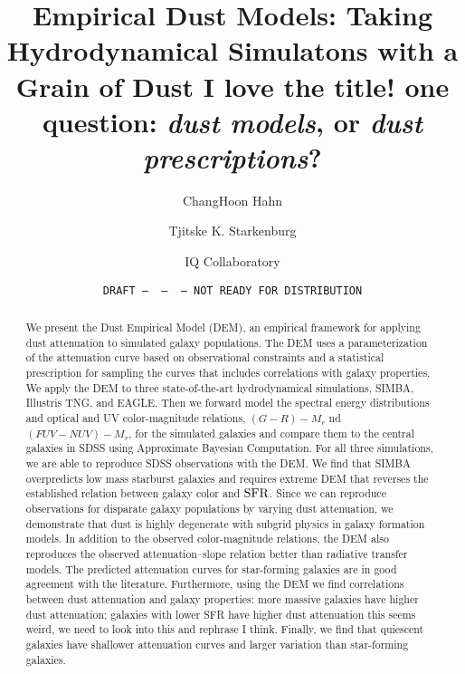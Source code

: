 \documentclass[12pt, letterpaper, preprint]{aastex62}
\newcommand{\gr}{G{-}R}
\newcommand{\fnuv}{FUV{-}NUV}
\newcommand{\sfr}{{\rm SFR}}
\newcommand{\tks}[1]{{\color{blue}{\bf TKS:} #1}}
\begin{document}
\sloppy\sloppypar\frenchspacing 

\title{Empirical Dust Models: Taking Hydrodynamical Simulatons with a Grain of Dust \tks{I love the title! one question: \emph{dust models}, or \emph{dust prescriptions}?}}
\date{\texttt{DRAFT~---~\githash~---~\gitdate~---~NOT READY FOR DISTRIBUTION}}

\author{ChangHoon Hahn}

\author{Tjitske K. Starkenburg}

\author{IQ Collaboratory}

\begin{abstract}
    We present the Dust Empirical Model (DEM), an empirical framework for
    applying dust attenuation to simulated galaxy populations. The DEM uses 
    a parameterization of the attenuation curve based on observational constraints 
    and a statistical prescription for sampling the curves that includes
    correlations with galaxy properties. We apply the DEM to three state-of-the-art 
    hydrodynamical simulations, SIMBA, Illustris TNG, and EAGLE. Then 
    we forward model the spectral energy distributions and optical and 
    UV color-magnitude relations, $(\gr) - M_r$ nd $(\fnuv)-M_r$, for the 
    simulated galaxies and compare them to the central galaxies in SDSS 
    using Approximate Bayesian Computation. For all three simulations, we are 
    able to reproduce SDSS observations with the DEM. We find that SIMBA overpredicts low mass starburst galaxies and
    requires extreme DEM that reverses the established relation between galaxy
    color and $\sfr$. Since we can reproduce observations for disparate galaxy
    populations by varying dust attenuation, we demonstrate that dust is highly
    degenerate with subgrid physics in galaxy formation models. In addition to
    the observed color-magnitude relations, the DEM also reproduces the
    observed attenuation--slope relation better than radiative transfer models.
    The predicted attenuation curves for star-forming galaxies are in good agreement with the
    literature. Furthermore, using the DEM we find correlations between dust
    attenuation and galaxy properties: more massive galaxies have higher dust
    attenuation; galaxies with lower SFR have higher dust attenuation \tks{this seems weird, we need to look into this and rephrase I think}. Finally, 
    we find that quiescent galaxies have shallower attenuation curves and 
    larger variation than star-forming galaxies.
\end{abstract}
\end{document}
